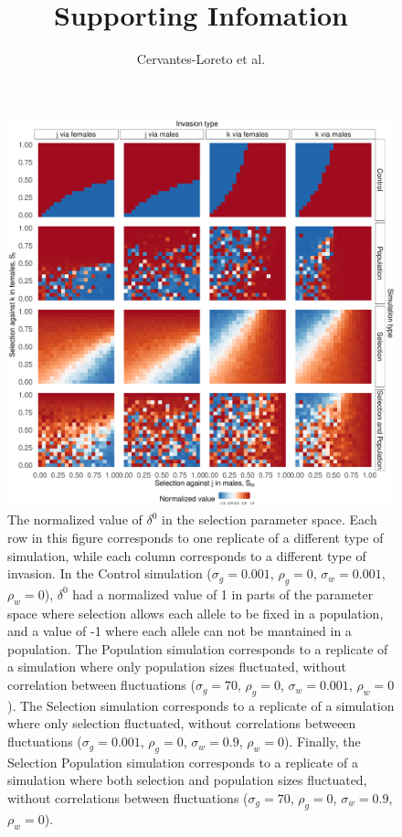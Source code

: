 \documentclass[12pt]{article}
\title{Supporting Infomation }
\author{Cervantes-Loreto et al.}
\date{}
\begin{document}
\maketitle
\renewcommand{\thesection}{S\arabic{section}}
\renewcommand{\thefigure}{S\arabic{figure}}
\renewcommand{\thetable}{S\arabic{table}}
\renewcommand{\theequation}{S\arabic{equation}}





\begin{figure}[H]
  \centerline{\includegraphics[width=1\textwidth]{ratios.pdf}}
  \caption{ The normalized value of  $\delta^{0}$ in the selection parameter space. Each row in this figure corresponds to one replicate of a different type of simulation, while each column corresponds to a different type of invasion. In the Control simulation ($\sigma_{g}=0.001$, $\rho_{g}=0$, $\sigma_{w}=0.001$, $\rho_{w}=0$), $\delta^{0}$ had a normalized value of 1 in parts of the parameter space where selection allows each allele to be fixed in a population, and a value of -1 where each allele can not be mantained in a population. The Population simulation corresponds to a replicate of a simulation where only population sizes fluctuated, without correlation between fluctuations ($\sigma_{g}=70$, $\rho_{g}=0$, $\sigma_{w}=0.001$, $\rho_{w}=0$). The Selection simulation corresponds to a replicate of a simulation where only selection fluctuated, without correlations betweeen fluctuations ($\sigma_{g}=0.001$, $\rho_{g}=0$, $\sigma_{w}=0.9$, $\rho_{w}=0$). Finally, the Selection Population simulation corresponds to a replicate of a simulation where both selection and population sizes fluctuated, without correlations between fluctuations ($\sigma_{g}=70$, $\rho_{g}=0$, $\sigma_{w}=0.9$, $\rho_{w}=0$).  }
    \label{fig:ratios}
\end{figure}
\end{document}
